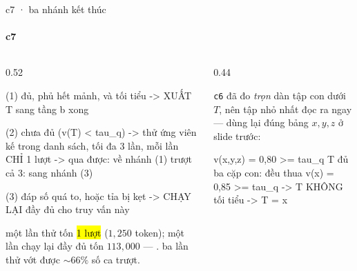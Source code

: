 \begin{frame}[fragile]{c7 · ba nhánh kết thúc}
  \framesubtitle{c7}

  \begin{columns}[t]
  \begin{column}{0.52\textwidth}
    \begin{bx}[title={ba nhánh}]
      \begin{dia}
(1) đủ, phủ hết mảnh, và tối tiểu
    -> XUẤT T sang tầng b                 xong

(2) chưa đủ  (v(T) < tau_q)
    -> thử ứng viên kế trong danh sách,
       tối đa 3 lần, mỗi lần CHỈ 1 lượt
    -> qua được: về nhánh (1)
       trượt cả 3: sang nhánh (3)

(3) đáp số quá to, hoặc tỉa bị kẹt
    -> CHẠY LẠI đầy đủ cho truy vấn này
      \end{dia}
    \end{bx}
    \begin{keyb}[title={nhánh 2 rẻ hơn tưởng rất nhiều}]
      một lần thử tốn \hl{1 lượt} ($1{,}250$ token); một lần chạy lại đầy đủ tốn
      $113{,}000$ — . ba lần thử vớt
      được ${\sim}66\%$ số ca trượt.
    \end{keyb}
  \end{column}
  \begin{column}{0.44\textwidth}
    \begin{bx}[title={ca «đủ mà không tối tiểu» KHÔNG phải chạy lại}]
      \texttt{c6} đã đo \emph{trọn} dàn tập con dưới $T$, nên tập nhỏ nhất đọc ra
      ngay — dùng lại đúng bảng $x,y,z$ ở slide trước:
      \begin{dia}
v({x,y,z}) = 0,80 >= tau_q   T đủ
   ba cặp con: đều thua
   v({x}) = 0,85 >= tau_q
             -> T KHÔNG tối tiểu
             -> T = {x}
      \end{dia}
      \vspace{0.25em}
    \end{bx}
  \end{column}
  \end{columns}
\end{frame}

